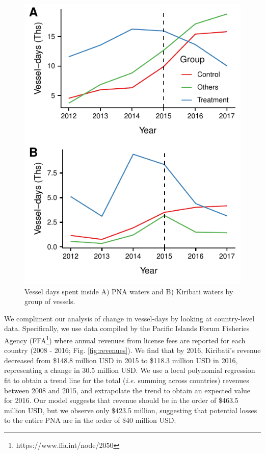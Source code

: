 \documentclass[9p,twocolumn,twoside,lineno]{pnas-new}
\begin{document}
\begin{figure}[ht]
\centering
	\includegraphics{img/included_PS_VDS_year_DiD.pdf}
	\caption{\label{fig:included_PS_VDS_year_DiD}Vessel days spent inside A) PNA waters and B) Kiribati waters by group of vessels.}
\end{figure}

We compliment our analysis of change in vessel-days by looking at country-level data. Specifically, we use data compiled by the Pacific Islands Forum Fisheries Agency (FFA\footnote{https://www.ffa.int/node/2050}) where annual revenues from license fees are reported for each country (2008 - 2016; Fig. \ref{fig:revenues}). We find that by 2016, Kiribati's revenue decreased from \$148.8 million USD in 2015 to \$118.3 million USD in 2016, representing a change in 30.5 million USD. We use a local polynomial regression fit to obtain a trend line for the total (\emph{i.e.} summing across countries) revenues between 2008 and 2015, and extrapolate the trend to obtain an expected value for 2016. Our model suggests that revenue should be in the order of \$463.5 million USD, but we observe only \$423.5 million, suggesting that potential losses to the entire PNA are in the order of \$40 million USD.
\end{document}
